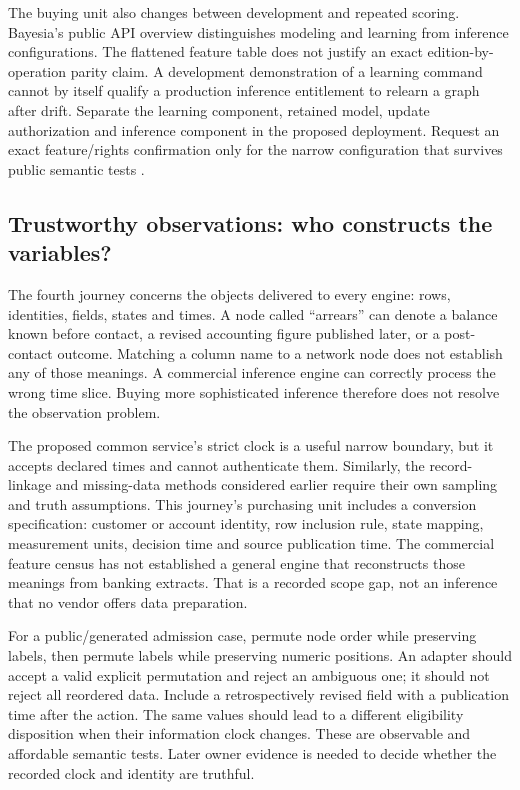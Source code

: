 The buying unit also changes between development and repeated scoring.
Bayesia's public API overview distinguishes modeling and learning from
inference configurations. The flattened feature table does not justify an
exact edition-by-operation parity claim. A development demonstration of a
learning command cannot by itself qualify a production inference entitlement
to relearn a graph after drift. Separate the learning component, retained
model, update authorization and inference component in the proposed deployment.
Request an exact feature/rights confirmation only for the narrow configuration
that survives public semantic tests \citep{exec13_bayesia_api}.

\subsection{Trustworthy observations: who constructs the variables?}

The fourth journey concerns the objects delivered to every engine: rows,
identities, fields, states and times. A node called ``arrears'' can denote a
balance known before contact, a revised accounting figure published later, or
a post-contact outcome. Matching a column name to a network node does not
establish any of those meanings. A commercial inference engine can correctly
process the wrong time slice. Buying more sophisticated inference therefore
does not resolve the observation problem.

The proposed common service's strict clock is a useful narrow boundary, but
it accepts declared times and cannot authenticate them. Similarly, the record-linkage and missing-data methods considered earlier require their own
sampling and truth assumptions. This journey's purchasing unit includes a
conversion specification: customer or account identity, row inclusion rule,
state mapping, measurement units, decision time and source publication time.
The commercial feature census has not established a general engine that
reconstructs those meanings from banking extracts. That is a recorded scope
gap, not an inference that no vendor offers data preparation.

For a public/generated admission case, permute node order while preserving
labels, then permute labels while preserving numeric positions. An adapter
should accept a valid explicit permutation and reject an ambiguous one; it
should not reject all reordered data. Include a retrospectively revised field
with a publication time after the action. The same values should lead to a
different eligibility disposition when their information clock changes.
These are observable and affordable semantic tests. Later owner evidence is
needed to decide whether the recorded clock and identity are truthful.

